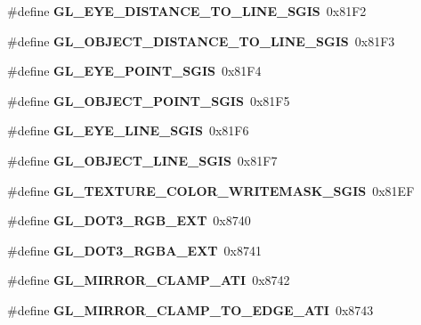 \begin{DoxyCompactItemize}
\item 
\#define {\bfseries G\+L\+\_\+\+E\+Y\+E\+\_\+\+D\+I\+S\+T\+A\+N\+C\+E\+\_\+\+T\+O\+\_\+\+L\+I\+N\+E\+\_\+\+S\+G\+I\+S}~0x81\+F2\label{_s_d_l__opengl_8h_a9e033132bd5129f5f97b071f4e12633a}

\item 
\#define {\bfseries G\+L\+\_\+\+O\+B\+J\+E\+C\+T\+\_\+\+D\+I\+S\+T\+A\+N\+C\+E\+\_\+\+T\+O\+\_\+\+L\+I\+N\+E\+\_\+\+S\+G\+I\+S}~0x81\+F3\label{_s_d_l__opengl_8h_a2fdd87fe455b0c5fe91bb8b173d9d2c4}

\item 
\#define {\bfseries G\+L\+\_\+\+E\+Y\+E\+\_\+\+P\+O\+I\+N\+T\+\_\+\+S\+G\+I\+S}~0x81\+F4\label{_s_d_l__opengl_8h_a7809b264de94f9ea7b9fa83ae456f5a7}

\item 
\#define {\bfseries G\+L\+\_\+\+O\+B\+J\+E\+C\+T\+\_\+\+P\+O\+I\+N\+T\+\_\+\+S\+G\+I\+S}~0x81\+F5\label{_s_d_l__opengl_8h_a74e16f57908a5be55d3f99c55bd1bffe}

\item 
\#define {\bfseries G\+L\+\_\+\+E\+Y\+E\+\_\+\+L\+I\+N\+E\+\_\+\+S\+G\+I\+S}~0x81\+F6\label{_s_d_l__opengl_8h_a209293384e2d8d7a238d88fe177dac13}

\item 
\#define {\bfseries G\+L\+\_\+\+O\+B\+J\+E\+C\+T\+\_\+\+L\+I\+N\+E\+\_\+\+S\+G\+I\+S}~0x81\+F7\label{_s_d_l__opengl_8h_ab60a2a4bb8cbc99038fe60a55d7e3a0f}

\item 
\#define {\bfseries G\+L\+\_\+\+T\+E\+X\+T\+U\+R\+E\+\_\+\+C\+O\+L\+O\+R\+\_\+\+W\+R\+I\+T\+E\+M\+A\+S\+K\+\_\+\+S\+G\+I\+S}~0x81\+E\+F\label{_s_d_l__opengl_8h_a7c27686eec31c991a6ffd1bf4edd1534}

\item 
\#define {\bfseries G\+L\+\_\+\+D\+O\+T3\+\_\+\+R\+G\+B\+\_\+\+E\+X\+T}~0x8740\label{_s_d_l__opengl_8h_ad804c64ee77baeb1713dd2c5c416db30}

\item 
\#define {\bfseries G\+L\+\_\+\+D\+O\+T3\+\_\+\+R\+G\+B\+A\+\_\+\+E\+X\+T}~0x8741\label{_s_d_l__opengl_8h_acf539358f110d68224eca4dced619a10}

\item 
\#define {\bfseries G\+L\+\_\+\+M\+I\+R\+R\+O\+R\+\_\+\+C\+L\+A\+M\+P\+\_\+\+A\+T\+I}~0x8742\label{_s_d_l__opengl_8h_ae67e7cf5a7fac4c02892bc10b07ca090}

\item 
\#define {\bfseries G\+L\+\_\+\+M\+I\+R\+R\+O\+R\+\_\+\+C\+L\+A\+M\+P\+\_\+\+T\+O\+\_\+\+E\+D\+G\+E\+\_\+\+A\+T\+I}~0x8743\label{_s_d_l__opengl_8h_a1d4bb0e3aaeb94e757a301235eeed323}


\end{DoxyCompactItemize}
